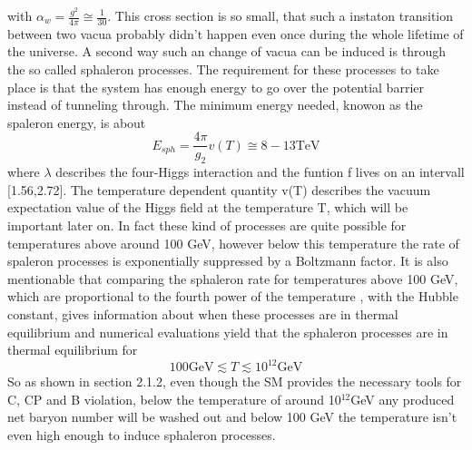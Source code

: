with $\alpha_w=\frac{g^2}{4\pi}\cong\frac{1}{30}$.
This cross section is so small, that such a instaton transition between two vacua probably didn't happen even once during the whole lifetime of the universe. \newline
A second way such an change of vacua can be induced is through the so called sphaleron processes. The requirement for these processes to take place is that the system has enough energy to go over the potential barrier instead of tunneling through. The minimum energy needed, knowon as the spaleron energy, is about\cite{Bernreuther:2002uj,Cline:2006ts}
\begin{equation}
	E_{sph}=\frac{4\pi}{g_2}v(T)\cong8-13\text{TeV}
	\label{spaleron}
\end{equation} 
where $\lambda$ describes the four-Higgs interaction and the funtion f lives on an intervall [1.56,2.72]. The temperature dependent quantity v(T) describes the vacuum expectation value of the Higgs field at the temperature T, which will be important later on.\newline
In fact these kind of processes are quite possible for temperatures above around 100 GeV, however below this temperature the rate of spaleron processes is exponentially suppressed by a Boltzmann factor. It is also mentionable that comparing the sphaleron rate for temperatures above 100 GeV, which are proportional to the fourth power of the temperature \cite[p. 19]{Bernreuther:2002uj}, with the Hubble constant, gives information about when these processes are in thermal equilibrium and numerical evaluations yield that the sphaleron processes are in thermal equilibrium for
\begin{equation*}
100\text{GeV}\lesssim T \lesssim 10^{12}\text{GeV}
\end{equation*}
So as shown in section 2.1.2, even though the SM provides the necessary tools for C, CP and B violation, below the temperature of around 10$^{12}$GeV any produced net baryon number will be washed out and below 100 GeV the temperature isn't even high enough to induce sphaleron processes. \newline
